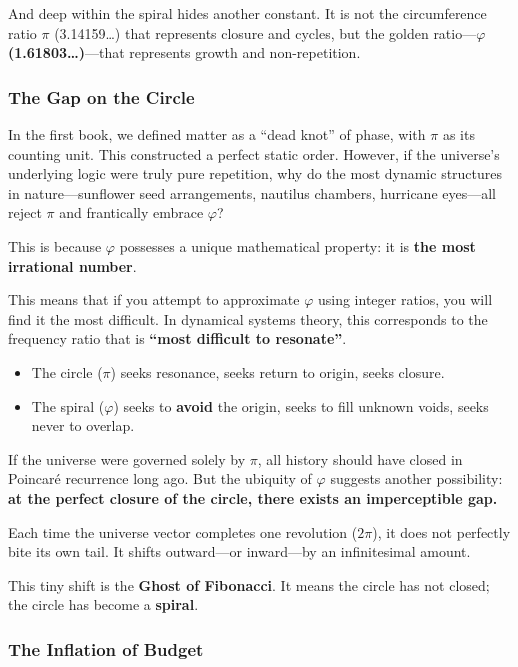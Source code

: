 And deep within the spiral hides another constant. It is not the circumference ratio $\pi$ (3.14159\ldots) that represents closure and cycles, but the golden ratio---\textbf{$\varphi$ (1.61803\ldots)}---that represents growth and non-repetition.

\subsubsection{The Gap on the Circle}

In the first book, we defined matter as a ``dead knot'' of phase, with $\pi$ as its counting unit. This constructed a perfect static order. However, if the universe's underlying logic were truly pure repetition, why do the most dynamic structures in nature---sunflower seed arrangements, nautilus chambers, hurricane eyes---all reject $\pi$ and frantically embrace $\varphi$?

This is because $\varphi$ possesses a unique mathematical property: it is \textbf{the most irrational number}.

This means that if you attempt to approximate $\varphi$ using integer ratios, you will find it the most difficult. In dynamical systems theory, this corresponds to the frequency ratio that is \textbf{``most difficult to resonate''}.

\begin{itemize}
\item The circle ($\pi$) seeks resonance, seeks return to origin, seeks closure.

\item The spiral ($\varphi$) seeks to \textbf{avoid} the origin, seeks to fill unknown voids, seeks never to overlap.
\end{itemize}

If the universe were governed solely by $\pi$, all history should have closed in Poincaré recurrence long ago. But the ubiquity of $\varphi$ suggests another possibility: \textbf{at the perfect closure of the circle, there exists an imperceptible gap.}

Each time the universe vector completes one revolution ($2\pi$), it does not perfectly bite its own tail. It shifts outward---or inward---by an infinitesimal amount.

This tiny shift is the \textbf{Ghost of Fibonacci}. It means the circle has not closed; the circle has become a \textbf{spiral}.

\subsubsection{The Inflation of Budget}


